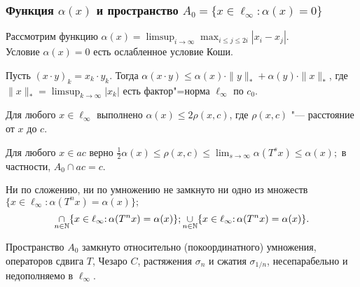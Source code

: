 \begin{varwidth}[v]{0.52\linewidth}
	\frametitle{Функция $\alpha(x)$ и пространство $A_0=\{x\in\ell_\infty:\alpha(x)=0\}$~\cite{avdeev2019space,our-ped-2018-alpha-Tx,our-vzms-2018}}

	Рассмотрим функцию
	$\displaystyle
		\alpha(x) = \limsup_{i\to\infty} \max_{i \leq j \leq 2i} |x_i-x_j|
	$.
	\\
	Условие $\alpha(x) = 0$ есть ослабленное условие Коши.
	\vspace{0.25em}



	\begin{theorem}
		Пусть $(x\cdot y)_k = x_k\cdot y_k$.
		Тогда
		$\alpha(x\cdot y)\leq \alpha(x)\cdot \|y\|_* + \alpha(y)\cdot \|x\|_*$,
		где
		$\displaystyle\|x\|_* = \limsup_{k\to\infty} |x_k|$
		есть фактор"=норма $\ell_\infty$ по $c_0$.
	\end{theorem}
	\begin{lemma}
		Для любого $x\in\ell_\infty$
		выполнено
		$
			\alpha(x) \leq 2\rho(x, c)
		$,
		где $\rho(x,c)$ "--- расстояние от $x$ до $c$.
	\end{lemma}
	\begin{theorem}
		Для любого $x\in ac$ верно
		$\displaystyle
			\frac{1}{2} \alpha(x) \leq \rho(x,c)\leq \lim_{s\to\infty} \alpha(T^s x) \leq \alpha(x)
			;
		$
		в частности, $A_0 \cap ac = c$.
	\end{theorem}
	\vspace{0.2em}
	\begin{theorem}
		Ни по сложению, ни по умножению не замкнуто ни  одно из множеств
		$\displaystyle
			\{x \in \ell_\infty : \alpha(T^n x) = \alpha(x) \};%
		$
		$$\displaystyle
			\mathop{\cap}\limits_{n\in\mathbb{N}}\{x \in \ell_\infty {:\,} \alpha(T^n x) = \alpha(x) \};
		\hfill
		\displaystyle
			\mathop{\cup}_{n\in\mathbb{N}}\{x \in \ell_\infty {:\,} \alpha(T^n x) = \alpha(x) \}
			.
		$$
		\vspace{-1.2em}
	\end{theorem}

	\begin{theorem}
		Пространство $A_0$ замкнуто относительно
		(покоординатного) умножения,
		операторов сдвига $T$, Чезаро $C$,
		растяжения $\sigma_n$ и сжатия $\sigma_{1/n}$,
		несепарабельно и недополняемо в $\ell_\infty$.
	\end{theorem}


\end{varwidth}
